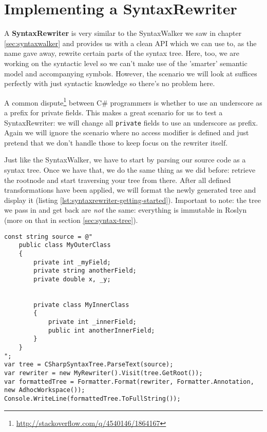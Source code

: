 \chapter{Implementing a SyntaxRewriter}
\label{sec:syntaxrewriter}

A \textbf{SyntaxRewriter} is very similar to the SyntaxWalker we saw in chapter \ref{sec:syntaxwalker} and provides us with a clean API which we can use to, as the name gave away, rewrite certain parts of the syntax tree. Here, too, we are working on the syntactic level so we can't make use of the 'smarter' semantic model and accompanying symbols. However, the scenario we will look at suffices perfectly with just syntactic knowledge so there's no problem here.

A common dispute\footnote{\url{http://stackoverflow.com/q/4540146/1864167}} between C\# programmers is whether to use an underscore as a prefix for private fields. This makes a great scenario for us to test a SyntaxRewriter: we will change all \texttt{private} fields to use an underscore as prefix. Again we will ignore the scenario where no access modifier is defined and just pretend that we don't handle those to keep focus on the rewriter itself.

Just like the SyntaxWalker, we have to start by parsing our source code as a syntax tree. Once we have that, we do the same thing as we did before: retrieve the rootnode and start traversing your tree from there. After all defined transformations have been applied, we will format the newly generated tree and display it (listing \ref{lst:syntaxrewriter-getting-started}). Important to note: the tree we pass in and get back are \textit{not} the same: everything is immutable in Roslyn (more on that in section \ref{sec:syntax-tree}).

\begin{lstlisting}[label={lst:syntaxrewriter-getting-started}]
const string source = @"
	public class MyOuterClass
	{
	    private int _myField;
	    private string anotherField;
	    private double x, _y;
	    
	
	    private class MyInnerClass
	    {
	        private int _innerField;
	        public int anotherInnerField;
	    }
	}
";
var tree = CSharpSyntaxTree.ParseText(source);
var rewriter = new MyRewriter().Visit(tree.GetRoot());
var formattedTree = Formatter.Format(rewriter, Formatter.Annotation, new AdhocWorkspace());
Console.WriteLine(formattedTree.ToFullString());
\end{lstlisting}

